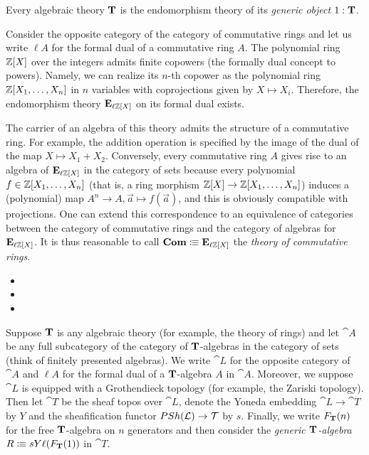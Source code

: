 {\begin{remark}
  Every algebraic theory \(\mathbf{T}\) is the endomorphism theory of its \emph{generic object} \(1:\mathbf{T}\).
\end{remark}

\begin{example}
  Consider the opposite category of the category of commutative rings and let us write \(\ell A\) for the formal dual of a commutative ring \(A\).
  The polynomial ring \(\mathbb{Z}[X]\) over the integers admits finite copowers (the formally dual concept to powers).
  Namely, we can realize its \(n\)-th copower as the polynomial ring \(\mathbb{Z}[X_1,\dots,X_n]\) in \(n\) variables with coprojections given by \(X\mapsto X_i\).
  Therefore, the endomorphism theory \(\mathbf{E}_{\ell\mathbb{Z}[X]}\) on its formal dual exists.

  The carrier of an algebra of this theory admits the structure of a commutative ring.
  For example, the addition operation is specified by the image of the dual of the map \(X\mapsto X_1+X_2\).
  Conversely, every commutative ring \(A\) gives rise to an algebra of \(\mathbf{E}_{\ell\mathbb{Z}[X]}\) in the category of sets because every polynomial \(f\in\mathbb{Z}[X_1,\dots,X_n]\) (that is, a ring morphism \(\mathbb{Z}[X]\to\mathbb{Z}[X_1,\dots,X_n]\)) induces a (polynomial) map \(A^n\to A, \vec{a}\mapsto f(\vec{a})\), and this is obviously compatible with projections.
  One can extend this correspondence to an equivalence of categories between the category of commutative rings and the category of algebras for \(\mathbf{E}_{\ell\mathbb{Z}[X]}\).
  It is thus reasonable to call \(\mathbf{Com}\vcentcolon\mspace{-1.2mu}\equiv\mathbf{E}_{\ell\mathbb{Z}[X]}\) the \emph{theory of commutative rings}.
\end{example}

\begin{itemize}
  \item{}
  \item{}
  \item{}
\end{itemize}

Suppose \(\mathbf{T}\) is any algebraic theory (for example, the theory of rings) and let \(\cat A\) be any full subcategory of the category of \(\mathbf{T}\)-algebras in the category of sets (think of finitely presented algebras).
We write \(\cat L\) for the opposite category of \(\cat A\) and \(\ell A\) for the formal dual of a \(\mathbf{T}\)-algebra \(A\) in \(\cat A\).
Moreover, we suppose \(\cat L\) is equipped with a Grothendieck topology (for example, the Zariski topology).
Then let \(\cat T\) be the sheaf topos over \(\cat L\), denote the Yoneda embedding \(\cat L\to\cat T\) by \(Y\) and the sheafification functor \(\mathop{PSh}(\mathcal{L})\to\mathcal{T}\) by \(s\).
Finally, we write \(F_{\mathbf{T}}(n)\) for the free \(\mathbf{T}\)-algebra on \(n\) generators and then consider the \emph{generic \(\mathbf{T}\)-algebra} \(R\vcentcolon\mspace{-1.2mu}\equiv sY\ell(F_{\mathbf{T}}(1))\) in \(\cat T\).

}
